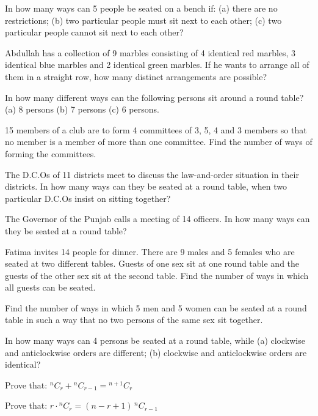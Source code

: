 \documentclass[11pt,a4paper]{article}
\begin{document}
\begin{longlist}
\item In how many ways can 5 people be seated on a bench if: (a) there are no restrictions; (b) two particular people must sit next to each other; (c) two particular people cannot sit next to each other?

\item Abdullah has a collection of 9 marbles consisting of 4 identical red marbles, 3 identical blue marbles and 2 identical green marbles. If he wants to arrange all of them in a straight row, how many distinct arrangements are possible?

\item In how many different ways can the following persons sit around a round table? (a) 8 persons (b) 7 persons (c) 6 persons.

\item 15 members of a club are to form 4 committees of 3, 5, 4 and 3 members so that no member is a member of more than one committee. Find the number of ways of forming the committees.

\item The D.C.Os of 11 districts meet to discuss the law-and-order situation in their districts. In how many ways can they be seated at a round table, when two particular D.C.Os insist on sitting together?

\item The Governor of the Punjab calls a meeting of 14 officers. In how many ways can they be seated at a round table?

\item Fatima invites 14 people for dinner. There are 9 males and 5 females who are seated at two different tables. Guests of one sex sit at one round table and the guests of the other sex sit at the second table. Find the number of ways in which all guests can be seated.

\item Find the number of ways in which 5 men and 5 women can be seated at a round table in such a way that no two persons of the same sex sit together.

\item In how many ways can 4 persons be seated at a round table, while (a) clockwise and anticlockwise orders are different; (b) clockwise and anticlockwise orders are identical?

\item Prove that: ${}^{n}C_r + {}^{n}C_{r-1} = {}^{n+1}C_r$

\item Prove that: $r\cdot{}^{n}C_r = (n-r+1)\,{}^{n}C_{r-1}$


\end{longlist}
\end{document}
